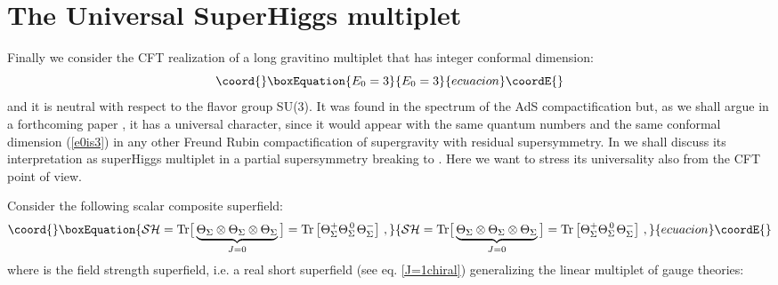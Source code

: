 \documentclass[a4paper,12pt]{article}
\def\n010{N^{0,1,0}}
\begin{document}
\section{The Universal SuperHiggs multiplet}
\label{suphigs}
Finally we consider the CFT realization of a long gravitino multiplet that
has integer conformal dimension:
\begin{equation}\coord{}\boxEquation{
  E_0 =3
\label{e0is3}
}{
  E_0 =3
}{ecuacion}\coordE{}\end{equation}
and it is neutral with respect to the flavor group SU(3).
It was found in the spectrum of the AdS\myHighlight{$_4 \times \n010$}\coordHE{}
compactification \cite{osp34} but, as we shall argue in a forthcoming
paper \cite{noinext}, it has a universal character, since it would
appear with the same quantum numbers and the same conformal dimension
(\ref{e0is3}) in any other Freund Rubin compactification of \coordHE{}
supergravity with \coordHE{} residual supersymmetry.
In \cite{noinext} we shall discuss its interpretation as superHiggs
multiplet in a partial supersymmetry breaking
\coordHE{} to \coordHE{}.
Here we want to stress its universality also from the CFT point of view.
\par
Consider the following scalar composite superfield:
\begin{equation}\coord{}\boxEquation{
{\cal SH}={\rm Tr}\big[\underbrace{\Theta_\Sigma\otimes\Theta_\Sigma\otimes
\Theta_\Sigma}_{J=0}\big]={\rm Tr}\left[\Theta_\Sigma^+\Theta_\Sigma^{\,0\,}
\Theta_\Sigma^-\right]\,,\label{superHiggs}
}{
{\cal SH}={\rm Tr}\big[\underbrace{\Theta_\Sigma\otimes\Theta_\Sigma\otimes
\Theta_\Sigma}_{J=0}\big]={\rm Tr}\left[\Theta_\Sigma^+\Theta_\Sigma^{\,0\,}
\Theta_\Sigma^-\right]\,,}{ecuacion}\coordE{}\end{equation}
where \myHighlight{$\Theta_\Sigma$}\coordHE{} is the field strength superfield, i.e. a real
\coordHE{} short superfield (see eq. \ref{J=1chiral}) generalizing the linear
multiplet of \coordHE{} gauge theories:
\end{document}
